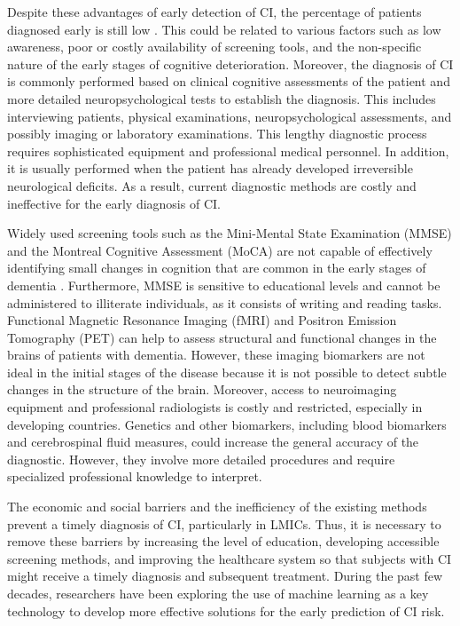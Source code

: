 Despite these advantages of early detection of CI, the percentage of patients diagnosed early is still low \cite{White2021Observational}. This could be related to various factors such as low awareness, poor or costly availability of screening tools, and the non-specific nature of the early stages of cognitive deterioration. Moreover, the diagnosis of CI is commonly performed based on clinical cognitive assessments of the patient and more detailed neuropsychological tests to establish the diagnosis. This includes interviewing patients, physical examinations, neuropsychological assessments, and possibly imaging or laboratory examinations. This lengthy diagnostic process requires sophisticated equipment and professional medical personnel. In addition, it is usually performed when the patient has already developed irreversible neurological deficits. As a result, current diagnostic methods are costly and ineffective for the early diagnosis of CI.

Widely used screening tools such as the Mini-Mental State Examination (\acrshort{MMSE}) and the Montreal Cognitive Assessment (\acrshort{MoCA}) are not capable of effectively identifying small changes in cognition that are common in the early stages of dementia \cite{Fraser2021Measuring}. Furthermore, MMSE is sensitive to educational levels and cannot be administered to illiterate individuals, as it consists of writing and reading tasks. Functional Magnetic Resonance Imaging (\acrshort{fMRI}) and Positron Emission Tomography (\acrshort{PET}) can help to assess structural and functional changes in the brains of patients with dementia. However, these imaging biomarkers are not ideal in the initial stages of the disease because it is not possible to detect subtle changes in the structure of the brain. Moreover, access to neuroimaging equipment and professional radiologists is costly and restricted, especially in developing countries. Genetics and other biomarkers, including blood biomarkers and cerebrospinal fluid measures, could increase the general accuracy of the diagnostic. However, they involve more detailed procedures and require specialized professional knowledge to interpret. 

The economic and social barriers and the inefficiency of the existing methods prevent a timely diagnosis of CI, particularly in LMICs. Thus, it is necessary to remove these barriers by increasing the level of education, developing accessible screening methods, and improving the healthcare system so that subjects with CI might receive a timely diagnosis and subsequent treatment. During the past few decades, researchers have been exploring the use of machine learning as a key technology to develop more effective solutions for the early prediction of CI risk.

